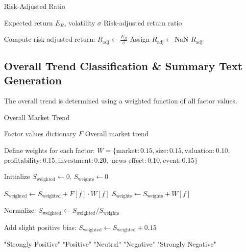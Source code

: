 \documentclass[3p,times,procedia]{elsarticle}
\begin{document}
\begin{algorithm}
\caption{Risk-Adjusted Ratio}
\label{alg:integrated_risk}
\begin{algorithmic}[1]
    \Require Expected return $E_R$, volatility $\sigma$
    \Ensure Risk-adjusted return ratio
    
        \State Compute risk-adjusted return: $R_{\text{adj}} \gets \frac{E_R}{\sigma}$
    \Else
        \State Assign $R_{\text{adj}} \gets \text{NaN}$
    \EndIf
    \State \Return $R_{\text{adj}}$
\end{algorithmic}
\end{algorithm}

\subsection{Overall Trend Classification \& Summary Text Generation}
The overall trend is determined using a weighted function of all factor values.


\begin{algorithm}
\caption{Overall Market Trend}
\label{alg:market_trend}
\begin{algorithmic}[1]
    \Require Factor values dictionary $F$
    \Ensure Overall market trend
    
    \State Define weights for each factor:
    \State \hspace{5mm} $W = \{ \text{market}: 0.15, \text{size}: 0.15, \text{valuation}: 0.10, $
    \State \hspace{10mm} $\text{profitability}: 0.15, \text{investment}: 0.20, $
    \State \hspace{10mm} $\text{news effect}: 0.10, \text{event}: 0.15 \}$

    \State Initialize $S_{\text{weighted}} \gets 0$, $S_{\text{weights}} \gets 0$
    
            \State $S_{\text{weighted}} \gets S_{\text{weighted}} + F[f] \cdot W[f]$
            \State $S_{\text{weights}} \gets S_{\text{weights}} + W[f]$
        \EndIf
    \EndFor

        \State Normalize: $S_{\text{weighted}} \gets S_{\text{weighted}} / S_{\text{weights}}$
    \EndIf
    
    \State Add slight positive bias: $S_{\text{weighted}} \gets S_{\text{weighted}} + 0.15$

        \State \Return "Strongly Positive"
        \State \Return "Positive"
        \State \Return "Neutral"
        \State \Return "Negative"
    \Else
        \State \Return "Strongly Negative"
    \EndIf

\end{algorithmic}
\end{algorithm}
\end{document}

